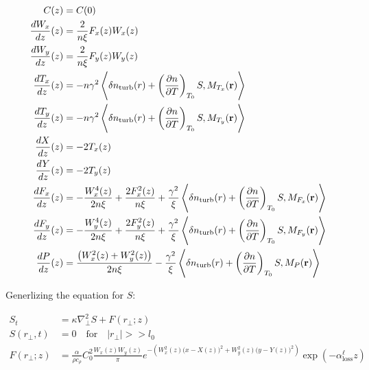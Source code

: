 \documentclass[a4paper, 12pt]{amsbook}
\newcommand\der[2]{\frac{d{#1}}{d{#2}}}
\begin{document}
\begin{equation*}
    \begin{aligned}     
  C(z) & = C(0) \\
  \der{W_{x}}{z}(z) & = \frac{2}{n \xi} F_{x}(z) W_{x}(z) \\
  \der{W_{y}}{z}(z) & = \frac{2}{n \xi} F_{y}(z) W_{y}(z)  \\ 
  \der{T_{x}}{z}(z) & = -n \gamma^{2} \left< \delta n_{\text{turb}}(r) + \left( \frac{\partial n}{\partial T} \right)_{T_0} S , M_{T_{x}}({\bf r}) \right>\\ 
  \der{T_{y}}{z}(z) & = -n \gamma^{2} \left< \delta n_{\text{turb}}(r) + \left( \frac{\partial n}{\partial T} \right)_{T_0} S , M_{T_{y}}({\bf r}) \right>  \\
  \der{X}{z}(z) & = -2T_{x}(z) \\
  \der{Y}{z}(z) & = -2T_{y}(z) \\
  \der{F_{x}}{z}(z) & = -\frac{W_{x}^{4}(z)}{2 n \xi} + \frac{2 F_{x}^{2}(z)}{n \xi} + \frac{\gamma^{2}}{\xi} \left< \delta n_{\text{turb}}(r) + \left( \frac{\partial n}{\partial T} \right)_{T_0} S , M_{F_{x}}({\bf r}) \right> \\
  \der{F_{y}}{z}(z) & = -\frac{W_{y}^{4}(z)}{2 n \xi} + \frac{2 F_{y}^{2}(z)}{n \xi} + \frac{\gamma^{2}}{\xi} \left< \delta n_{\text{turb}}(r) + \left( \frac{\partial n}{\partial T} \right)_{T_0} S , M_{F_{y}}({\bf r}) \right> \\
  \der{P}{z}(z) & = \frac{\left( W_{x}^{2}(z) + W_{y}^{2}(z) \right)}{2n \xi} - \frac{\gamma^{2}}{\xi} \left< \delta n_{\text{turb}}(r) + \left( \frac{\partial n}{\partial T} \right)_{T_0} S , M_{P}({\bf r}) \right>    \end{aligned}
\end{equation*}




Generlizing the equation for $S$:

\begin{equation*}
    \begin{aligned}
        S_{t} &= \kappa \nabla_{\perp}^2 S + F(r_{\perp}; z) \\
        S(r_{\perp},t) &= 0 \quad \mbox{for} \quad |r_\perp| >> l_0 \\
        F(r_{\perp}; z) &= \frac{\alpha }{\rho c_\rho} C_0^2 \frac{ W_{x}(z) W_{y}(z)}{\pi} e^{-\left( W_{x}^{2}(z) \big( x - X(z) \big)^{2} + W_{y}^{2}(z) \big( y - Y(z) \big)^{2} \right)} \exp{(- \alpha^\ell_\text{loss} z)}
    \end{aligned} 
\end{equation*}
\end{document}
